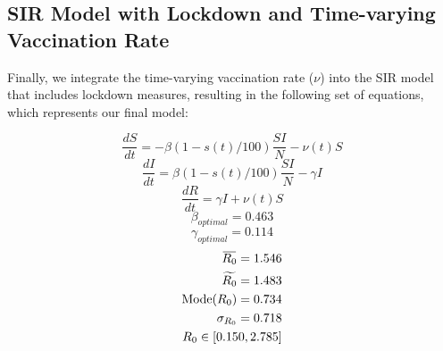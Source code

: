 \documentclass[tikz,fleqn,12pt]{wlscirep}
\newcommand{\overbar}[1]{\mkern 1.5mu\overline{\mkern-1.5mu#1\mkern-1.5mu}\mkern 1.5mu}
\begin{document}
\subsection{SIR Model with Lockdown and Time-varying Vaccination Rate}
Finally, we integrate the time-varying vaccination rate ($\nu$) into the SIR model that includes lockdown measures, resulting in the following set of equations, which represents our final model:
\begin{figure}[htbp!]
\end{figure}
\begin{equation}
  \frac{dS}{dt} = -\beta  (1 - s(t)/100)  \frac{S I}{N} - \nu(t) S
  \label{eq:S_with_lockdown_and_time_varying_nu}
\end{equation}
\begin{equation}
  \frac{dI}{dt} = \beta  (1 - s(t)/100) \frac{S I}{N} - \gamma I
  \label{eq:I_with_lockdown_and_time_varying_nu}
\end{equation}
\begin{equation}
  \frac{dR}{dt} = \gamma I + \nu(t) S
  \label{eq:R_with_lockdown_and_time_varying_nu}
\end{equation}
\begin{equation}
  \beta_{optimal} = 0.463
  \label{eq:beta_optimal_with_lockdown_and_time_varying_nu}
\end{equation}
\begin{equation}
  \gamma_{optimal} = 0.114
  \label{eq:gamma_optimal_with_lockdown_and_time_varying_nu}
\end{equation}
\begin{equation}
  \begin{split}
    \overbar{R_0} = 1.546 \\
    \widetilde{R_0} = 1.483 \\
    \text{Mode}(R_0) = 0.734 \\
    \sigma_{R_0} = 0.718 \\
    R_0 \in [0.150, 2.785]
  \end{split}
  \label{eq:r0_with_lockdown_and_time_varying_nu}
\end{equation}
\end{document}
